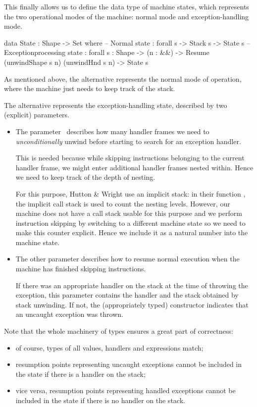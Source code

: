 \noindent This finally allows us to define the data type of machine states, which represents
the two operational modes of the machine: normal mode and exception-handling mode.
\begin{code}
  data State : Shape -> Set where
  	-- Normal state
  	\tick[_] : forall {s} -> Stack s -> State s
  	-- Exception\-processing state
  	\x[_,_] : forall {s : Shape}
  	  -> (n : \bN&\!&)
  	  -> Resume (unwindShape s n) (unwindHnd s n)
  	  -> State s
\end{code}

\noindent As mentioned above, the alternative \ident{\tick[\_]} represents the normal mode
of operation, where the machine just needs to keep track of the stack.

The alternative \ident{$\times$[\_,\_]} represents the exception-handling state, described by
two (explicit) parameters.
\begin{itemize}
	\item The parameter~ describes how many handler frames we need to
		\emph{unconditionally} unwind before starting to search for an exception handler.
		
		This is needed because while skipping instructions belonging to the current
		handler frame, we might enter additional handler frames nested within. Hence
		we need to keep track of the depth of nesting.
		
		For this purpose, Hutton \& Wright
		\cite[pg.~7]{gmh:exceptions} use an implicit stack:  in their
		function , the implicit call stack is used to count
		the nesting levels.
		However, our machine does not have a call stack usable for this
		purpose and we perform instruction skipping by switching to a
		different machine state so we need to make this counter
		explicit. Hence we include it as a natural number into the
		machine state.
		
	\item The other parameter describes how to resume normal execution when
		the machine has finished skipping instructions.
		
		If there was an appropriate handler on the stack at the time of throwing
		the exception, this parameter contains the handler and the stack obtained
		by stack unwinding. If not, the (appropriately typed) constructor
		 indicates that an uncaught exception was thrown.
\end{itemize}

\noindent Note that the whole machinery of types ensures a great part of correctness:
\begin{itemize}
	\item of course, types of all values, handlers and expressions match;
	\item resumption points representing uncaught exceptions cannot be included in the state
		if there is a handler on the stack;
	\item vice versa, resumption points representing handled exceptions cannot be included
		in the state if there is no handler on the stack.
\end{itemize}

